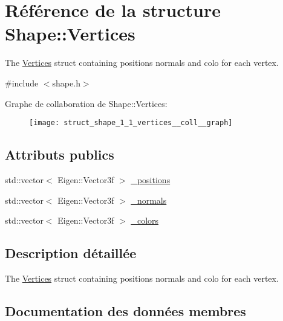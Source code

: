 \hypertarget{struct_shape_1_1_vertices}{}\section{Référence de la structure Shape\+:\+:Vertices}
\label{struct_shape_1_1_vertices}


The \hyperlink{struct_shape_1_1_vertices}{Vertices} struct containing positions normals and colo for each vertex.  




{\ttfamily \#include $<$shape.\+h$>$}



Graphe de collaboration de Shape\+:\+:Vertices\+:
\nopagebreak
\begin{figure}[H]
\begin{center}
\leavevmode
\texttt{[image: struct\_shape\_1\_1\_vertices\_\_coll\_\_graph]}
\end{center}
\end{figure}
\subsection*{Attributs publics}
\begin{DoxyCompactItemize}
\item 
std\+::vector$<$ Eigen\+::\+Vector3f $>$ \hyperlink{struct_shape_1_1_vertices_aef6a4c183b595cffa5e890e3ba06c64d}{\+\_\+positions}
\item 
std\+::vector$<$ Eigen\+::\+Vector3f $>$ \hyperlink{struct_shape_1_1_vertices_aa258b760267bf6e5b316ac6ec11a2ea3}{\+\_\+normals}
\item 
std\+::vector$<$ Eigen\+::\+Vector3f $>$ \hyperlink{struct_shape_1_1_vertices_a4f3730170f6a9b58be002ea913926e4a}{\+\_\+colors}
\end{DoxyCompactItemize}


\subsection{Description détaillée}
The \hyperlink{struct_shape_1_1_vertices}{Vertices} struct containing positions normals and colo for each vertex. 

\subsection{Documentation des données membres}
\mbox{\label{struct_shape_1_1_vertices_a4f3730170f6a9b58be002ea913926e4a}} 
